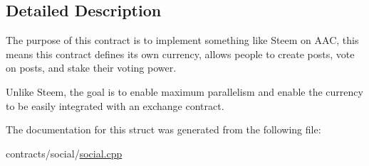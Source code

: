 \subsection{Detailed Description}
The purpose of this contract is to implement something like Steem on A\+AC, this means this contract defines its own currency, allows people to create posts, vote on posts, and stake their voting power.

Unlike Steem, the goal is to enable maximum parallelism and enable the currency to be easily integrated with an exchange contract. 

The documentation for this struct was generated from the following file\+:\begin{DoxyCompactItemize}
\item 
contracts/social/\mbox{\hyperlink{social_8cpp}{social.\+cpp}}\end{DoxyCompactItemize}
